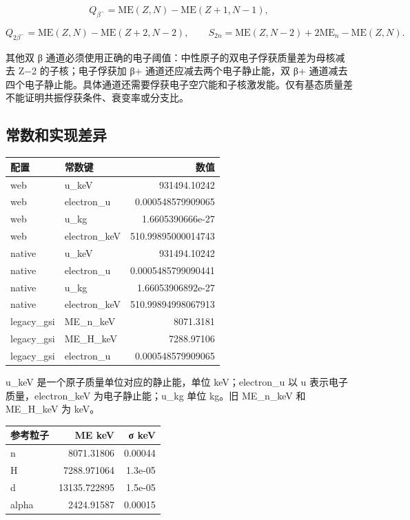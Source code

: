 \documentclass[
  11pt,
  letterpaper,
]{article}
\begin{document}
\[
Q_{\beta^-}=\mathrm{ME}(Z,N)-\mathrm{ME}(Z+1,N-1),
\]

\[
Q_{2\beta^-}=\mathrm{ME}(Z,N)-\mathrm{ME}(Z+2,N-2),\qquad
S_{2n}=\mathrm{ME}(Z,N-2)+2\mathrm{ME}_n-\mathrm{ME}(Z,N).
\]

其他双 β
通道必须使用正确的电子阈值：中性原子的双电子俘获质量差为母核减去 Z−2
的子核；电子俘获加 β+ 通道还应减去两个电子静止能，双 β+
通道减去四个电子静止能。具体通道还需要俘获电子空穴能和子核激发能。仅有基态质量差不能证明共振俘获条件、衰变率或分支比。

\subsection{常数和实现差异}\label{ux5e38ux6570ux548cux5b9eux73b0ux5deeux5f02}

\begin{longtable}[]{@{}llr@{}}
\toprule\noalign{}
配置 & 常数键 & 数值 \\
\midrule\noalign{}
\endhead
\bottomrule\noalign{}
\endlastfoot
web & u\_keV & 931494.10242 \\
web & electron\_u & 0.000548579909065 \\
web & u\_kg & 1.6605390666e-27 \\
web & electron\_keV & 510.99895000014743 \\
native & u\_keV & 931494.10242 \\
native & electron\_u & 0.0005485799090441 \\
native & u\_kg & 1.66053906892e-27 \\
native & electron\_keV & 510.99894998067913 \\
legacy\_gsi & ME\_n\_keV & 8071.3181 \\
legacy\_gsi & ME\_H\_keV & 7288.97106 \\
legacy\_gsi & electron\_u & 0.000548579909065 \\
\end{longtable}

u\_keV 是一个原子质量单位对应的静止能，单位 keV；electron\_u 以 u
表示电子质量，electron\_keV 为电子静止能；u\_kg 单位 kg。旧 ME\_n\_keV
和 ME\_H\_keV 为 keV。

\begin{longtable}[]{@{}lrr@{}}
\toprule\noalign{}
参考粒子 & ME keV & σ keV \\
\midrule\noalign{}
\endhead
\bottomrule\noalign{}
\endlastfoot
n & 8071.31806 & 0.00044 \\
H & 7288.971064 & 1.3e-05 \\
d & 13135.722895 & 1.5e-05 \\
alpha & 2424.91587 & 0.00015 \\
\end{longtable}
\end{document}
